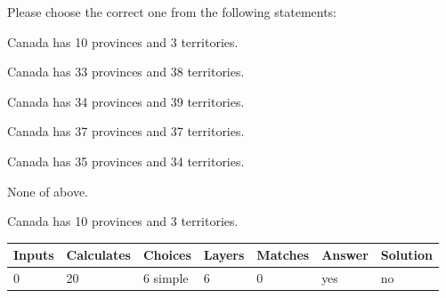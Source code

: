 \documentclass[12pt]{article}
\begin{document}
  
Please choose the correct one from the following statements:
 
 
Canada has  %
10 provinces and  %
3 territories.
 
 
Canada has  %
33 provinces and  %
38 territories.
 
 
Canada has  %
34 provinces and  %
39 territories.
 
 
Canada has  %
37 provinces and  %
37 territories.
 
 
Canada has  %
35 provinces and  %
34 territories.
 
 
 None of above.
 
 
\noindent{}
 
 
Canada has  %
10 provinces and  %
3 territories.
 
 
\noindent{}
 
 
   
   
   
   
\noindent\begin{tabular}{|l|l|l|l|l|l|l|}
 \hline
Inputs & Calculates & Choices & Layers & Matches & Answer & Solution \\ \hline
           0 & 
          20 & 
           6
  simple  
  & 
           6 & 
           0 & 
  yes & 
  no 
  \\ \hline
 \end{tabular}
   
   
   
   
\noindent{}
   
   
  
\end{document}
